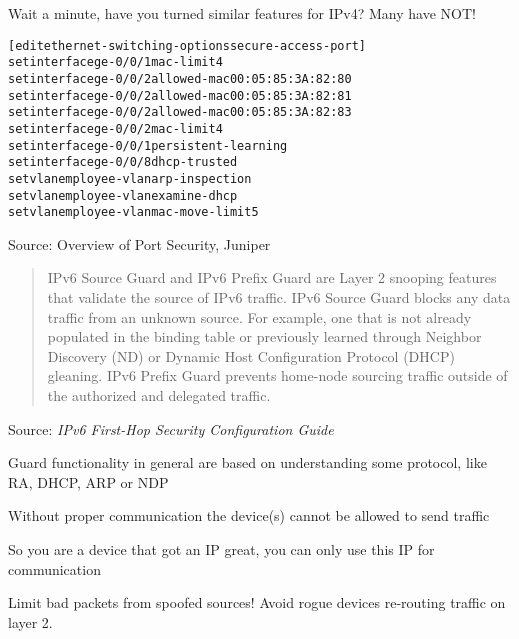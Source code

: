 \documentclass[Screen16to9,17pt]{foils}
\newcommand{\myalert}{\color{red}\faFlag}
\begin{document}
Wait a minute, have you turned similar features for IPv4? Many have NOT! {\myalert}


\begin{alltt}\small
[edit ethernet-switching-options secure-access-port]
set interface ge-0/0/1 mac-limit 4
set interface ge-0/0/2 allowed-mac 00:05:85:3A:82:80
set interface ge-0/0/2 allowed-mac 00:05:85:3A:82:81
set interface ge-0/0/2 allowed-mac 00:05:85:3A:82:83
set interface ge-0/0/2 mac-limit 4
set interface ge-0/0/1 persistent-learning
set interface ge-0/0/8 dhcp-trusted
set vlan employee-vlan arp-inspection
set vlan employee-vlan examine-dhcp
set vlan employee-vlan mac-move-limit 5
\end{alltt}

Source: Overview of Port Security, Juniper\\ {\small{}}



\begin{quote}
IPv6 Source Guard and IPv6 Prefix Guard are Layer 2 snooping features that validate the source of IPv6 traffic. IPv6 Source Guard blocks any data traffic from an unknown source. For example, one that is not already populated in the binding table or previously learned through Neighbor Discovery (ND) or Dynamic Host Configuration Protocol (DHCP) gleaning. IPv6 Prefix Guard prevents home-node sourcing traffic outside of the authorized and delegated traffic.
\end{quote}
Source: \emph{IPv6 First-Hop Security Configuration Guide}\\

\begin{list2}
\item Guard functionality in general are based on understanding some protocol, like RA, DHCP, ARP or NDP
\item Without proper communication the device(s) cannot be allowed to send traffic
\item So you are a device that got an IP great, you can only use this IP for communication
\end{list2}

Limit bad packets from spoofed sources! Avoid rogue devices re-routing traffic on layer 2.
\end{document}
